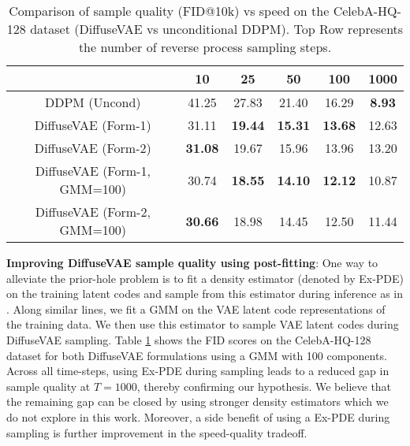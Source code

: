 \documentclass[10pt]{article} \usepackage[accepted]{tmlr}
\begin{document}
\begin{table}[]
\scriptsize
\centering
\begin{tabular}{@{}cccccc@{}}
\toprule
                             & 10             & 25             & 50             & 100            & 1000          \\ \midrule
DDPM (Uncond)                & 41.25          & 27.83          & 21.40          & 16.29          & \textbf{8.93} \\\midrule
DiffuseVAE (Form-1)          & 31.11          & \textbf{19.44}          & \textbf{15.31}          & \textbf{13.68}          & 12.63         \\
DiffuseVAE (Form-2)          & \textbf{31.08}          & 19.67          & 15.96          & 13.96          & 13.20         \\ \midrule
DiffuseVAE (Form-1, GMM=100) & 30.74          & \textbf{18.55} & \textbf{14.10} & \textbf{12.12} & 10.87         \\
DiffuseVAE (Form-2, GMM=100) & \textbf{30.66} & 18.98          & 14.45          & 12.50          & 11.44\\\bottomrule
\end{tabular}
\caption{Comparison of sample quality (FID@10k) vs speed on the CelebA-HQ-128 dataset (DiffuseVAE vs unconditional DDPM). Top Row represents the number of reverse process sampling steps.}
\label{table:svq_1}
\end{table}

\textbf{Improving DiffuseVAE sample quality using post-fitting}: One way to alleviate the prior-hole problem is to fit a density estimator (denoted by Ex-PDE) on the training latent codes and sample from this estimator during inference as in \citep{10.5555/3295222.3295378,razavi2019generating, Ghosh2020FromVT}. Along similar lines, we fit a GMM on the VAE latent code representations of the training data. We then use this estimator to sample VAE latent codes during DiffuseVAE sampling. Table \ref{table:svq_1} shows the FID scores on the CelebA-HQ-128 dataset for both DiffuseVAE formulations using a GMM with 100 components. Across all time-steps, using Ex-PDE during sampling leads to a reduced gap in sample quality at $T=1000$, thereby confirming our hypothesis. We believe that the remaining gap can be closed by using stronger density estimators which we do not explore in this work. Moreover, a side benefit of using a Ex-PDE during sampling is further improvement in the speed-quality tradeoff.
\end{document}
